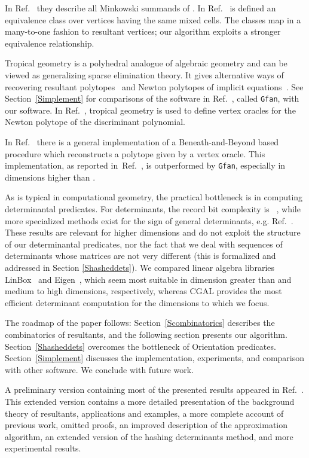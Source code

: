\documentclass{article}
\newcommand\refcite[1]{\citealp{#1}} \newcommand\citess[1]{\textsuperscript{\textup{\citealp{#1}}}}
\begin{document}
In Ref.~\refcite{MicCoo00} they describe all Minkowski summands of .
In Ref.~\refcite{MicVer99} is defined an equivalence class over
 vertices having the same mixed cells.
The classes map in a many-to-one fashion to resultant vertices;
our algorithm exploits a stronger equivalence relationship.

Tropical geometry is a polyhedral analogue of algebraic geometry 
and can be viewed as generalizing sparse elimination theory.
It gives alternative ways of recovering resultant
polytopes~\citess{JensenYu11} and Newton polytopes of implicit
equations~\citess{StuYu08}. 
See Section~\ref{Simplement} for comparisons of 
the software in Ref.~\refcite{JensenYu11}, called {\tt Gfan},  
with our software.
In Ref.~\refcite{Rincon12}, tropical geometry
is used to define vertex oracles for the Newton polytope of the
discriminant polynomial.

In Ref.~\refcite{Hug06} there is a general implementation of a
Beneath-and-Beyond based procedure which reconstructs a polytope given by a
vertex  oracle. This implementation, as reported in~Ref.~\refcite{JensenYu11}, 
is outperformed by {\tt Gfan}, especially in dimensions higher than . 

As is typical in computational geometry, the practical bottleneck
is in computing determinantal predicates.
For determinants, the record bit complexity is
~\citess{KaVi05},
while more specialized methods exist for the sign of general determinants,
e.g. Ref.~\refcite{BEPP99}.
These results are relevant for higher dimensions and do not exploit the
structure of our determinantal predicates, nor the fact that we deal
with sequences of determinants whose matrices are not very different
(this is formalized and addressed in Section \ref{Shasheddets}).
We compared linear algebra libraries LinBox~\citess{DGGGHKSTV} and
Eigen~\citess{eigenweb}, which seem most suitable in dimension greater than  and
medium to high dimensions, respectively, whereas CGAL provides the most
efficient determinant computation for the dimensions to which we focus.

The roadmap of the paper follows:
Section~\ref{Scombinatorics} describes the combinatorics of resultants, and
the following section presents our algorithm.
Section~\ref{Shasheddets} overcomes the bottleneck of Orientation predicates.
Section~\ref{Simplement} discusses the implementation, experiments, and 
comparison with other software.
We conclude with future work.  

A preliminary version containing most of the presented results 
appeared in Ref.~\refcite{EFKP12}. This extended version contains a more
detailed presentation of the background theory of resultants, applications
and examples, a more complete account of previous work, omitted proofs, 
an improved description of the approximation
algorithm, an extended version of the
hashing determinants method, and more experimental results.  
\end{document}
